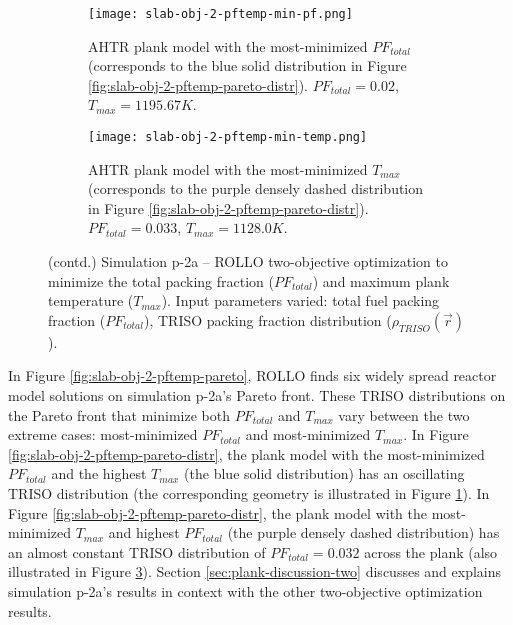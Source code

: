 \begin{figure}[htbp!]
    \ContinuedFloat
    \begin{subfigure}{\textwidth}
        \texttt{[image: slab-obj-2-pftemp-min-pf.png]}
        \caption{\gls{AHTR} plank model with the most-minimized $PF_{total}$
        (corresponds to the blue solid distribution in Figure 
        \ref{fig:slab-obj-2-pftemp-pareto-distr}). $PF_{total} = 0.02$, 
        $T_{max} = 1195.67K$.}
        \label{fig:slab-obj-2-pftemp-min-pf} 
    \end{subfigure}
    \begin{subfigure}{\textwidth}
        \texttt{[image: slab-obj-2-pftemp-min-temp.png]}
        \caption{\gls{AHTR} plank model with the most-minimized $T_{max}$
        (corresponds to the purple densely dashed distribution in Figure 
        \ref{fig:slab-obj-2-pftemp-pareto-distr}). $PF_{total} = 0.033$, 
        $T_{max} = 1128.0K$.}
        \label{fig:slab-obj-2-pftemp-min-temp} 
    \end{subfigure}
    \caption{(contd.) Simulation p-2a -- ROLLO two-objective optimization to minimize 
    the total packing fraction ($PF_{total}$) and maximum plank temperature ($T_{max}$). 
    Input parameters varied: total fuel packing fraction ($PF_{total}$), 
    \gls{TRISO} packing fraction distribution ($\rho_{TRISO}(\vec{r})$).}
\end{figure}

In Figure \ref{fig:slab-obj-2-pftemp-pareto}, \gls{ROLLO} finds six widely spread 
reactor model solutions on simulation p-2a's Pareto front. 
These \gls{TRISO} distributions on the Pareto front that minimize both $PF_{total}$ and 
$T_{max}$ vary between the two extreme cases: 
most-minimized $PF_{total}$ and most-minimized $T_{max}$. 
In Figure \ref{fig:slab-obj-2-pftemp-pareto-distr}, the plank model with the
most-minimized $PF_{total}$ and the highest $T_{max}$ (the blue solid distribution) 
has an oscillating TRISO distribution (the corresponding geometry is illustrated in
Figure \ref{fig:slab-obj-2-pftemp-min-pf}).
In Figure \ref{fig:slab-obj-2-pftemp-pareto-distr}, the plank model with the 
most-minimized $T_{max}$ and highest $PF_{total}$ (the purple densely dashed distribution)
has an almost constant TRISO distribution of $PF_{total}=0.032$ across the plank (also 
illustrated in Figure \ref{fig:slab-obj-2-pftemp-min-temp}). 
Section \ref{sec:plank-discussion-two} discusses and explains simulation p-2a's results
in context with the other two-objective optimization results.

